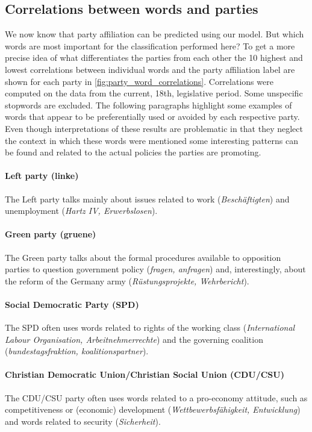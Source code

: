 \documentclass{article}
\begin{document}
\subsection{Correlations between words and parties}\label{sec:word_party_correlations}
We now know that party affiliation can be predicted using our model. But which words are most important for the classification performed here? To get a more precise idea of what differentiates the parties from each other the 10 highest and lowest correlations between individual words and the party affiliation label are shown for each party in \autoref{fig:party_word_correlations}. Correlations were computed on the data from the current, 18th, legislative period. Some unspecific stopwords are excluded.
The following paragraphs highlight some examples of words that appear to be preferentially used or avoided by each respective party. Even though interpretations of these results are problematic in that they neglect the context in which these words were mentioned some interesting patterns can be found and related to the actual policies the parties are promoting.
\paragraph{\bf Left party (linke)}
The Left party talks mainly about issues related to work ({\em Besch\"aftigten}) and unemployment ({\em Hartz IV, Erwerbslosen}). 
\paragraph{\bf Green party (gruene)}
The Green party talks about the formal procedures available to opposition parties to question government policy ({\em fragen, anfragen}) and, interestingly, about the reform of the Germany army ({\em R\"ustungsprojekte, Wehrbericht}).
\paragraph{\bf Social Democratic Party (SPD)}
The SPD often uses words related to rights of the working class ({\em International Labour Organisation, Arbeitnehmerrechte}) and the governing coalition ({\em bundestagsfraktion, koalitionspartner}).

\paragraph{\bf Christian Democratic Union/Christian Social Union (CDU/CSU)}
The CDU/CSU party often uses words related to a pro-economy attitude, such as competitiveness or (economic) development ({\em Wettbewerbsf\"ahigkeit, Entwicklung}) and words related to security ({\em Sicherheit}). 
\end{document}
